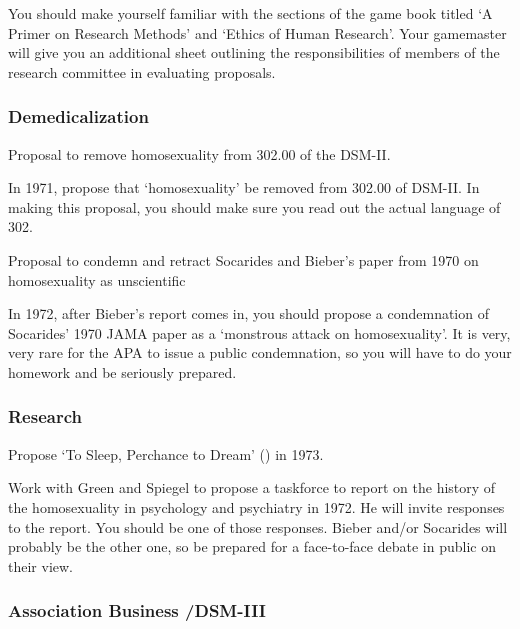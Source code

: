 \begin{refsection}
You should make yourself familiar with the sections of the game book titled `A Primer on Research Methods' and `Ethics of Human Research'. Your gamemaster will give you an additional sheet outlining the responsibilities of members of the research committee in evaluating proposals.

\subsubsection{Demedicalization}
\label{demedicalization}

\begin{proposal}[Marmor]\label{proposal:marmorA}Proposal to remove homosexuality from 302.00 of the DSM-II.\end{proposal}

In 1971, propose that `homosexuality' be removed from 302.00 of DSM-II. In making this proposal, you should make sure you read out the actual language of 302.

\begin{proposal}[Marmor]\label{proposal:marmorB}Proposal to condemn and retract Socarides and Bieber's paper from 1970 on homosexuality as unscientific
\end{proposal}

In 1972, after Bieber's report comes in, you should propose a condemnation of Socarides' 1970 JAMA paper as a `monstrous attack on homosexuality'. It is very, very rare for the APA to issue a public condemnation, so you will have to do your homework and be seriously prepared.

\subsubsection{Research}
\label{research}

\begin{researchtask}[Marmor]\label{researchtask:marmor}Propose ‘To Sleep, Perchance to Dream’ () in 1973.
\end{researchtask}

Work with Green and Spiegel to propose a taskforce to report on the history of the homosexuality in psychology and psychiatry in 1972. He will invite responses to the report. You should be one of those responses. Bieber and\slash or Socarides will probably be the other one, so be prepared for a face-to-face debate in public on their view.

\subsubsection{Association Business \slash  DSM-III}
\label{associationbusinessdsm-iii}


\end{refsection}
